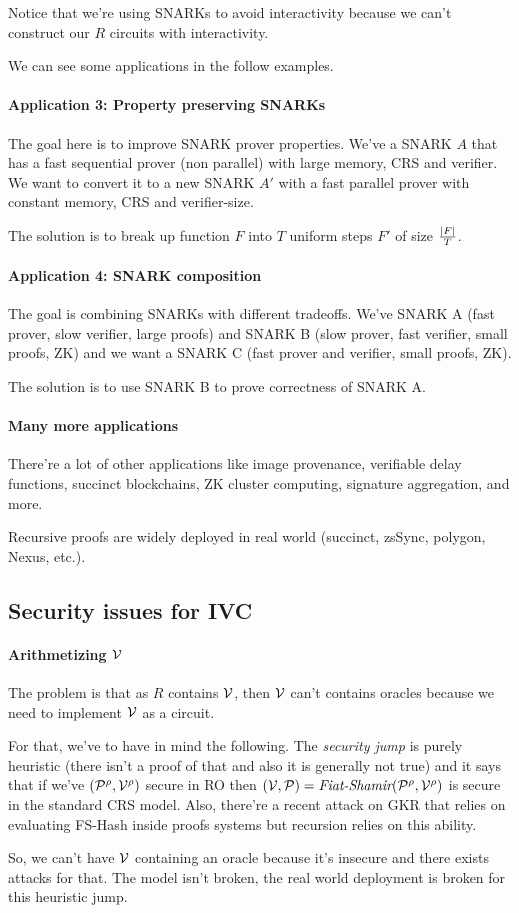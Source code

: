   Notice that we're using SNARKs to avoid interactivity because we can't construct 
  our $R$ circuits with interactivity.

  We can see some applications in the follow examples.

  \paragraph{Application 3: Property preserving SNARKs}
  The goal here is to improve SNARK prover properties.
  We've a SNARK $A$ that has a fast sequential prover (non parallel) with large memory, CRS and verifier.
  We want to convert it to a new SNARK $A'$ with a fast parallel prover with constant memory, CRS 
  and verifier-size.

  The solution is to break up function $F$ into $T$ uniform steps $F'$ of size $\frac{\left| F \right|}{T}$.

  \paragraph{Application 4: SNARK composition}
  The goal is combining SNARKs with different tradeoffs.
  We've SNARK A (fast prover, slow verifier, large proofs) and SNARK B 
  (slow prover, fast verifier, small proofs, ZK) and we want a SNARK C 
  (fast prover and verifier, small proofs, ZK).

  The solution is to use SNARK B to prove correctness of SNARK A.

  \paragraph{Many more applications}
  There're a lot of other applications like image provenance, verifiable delay 
  functions, succinct blockchains, ZK cluster computing, signature aggregation, and more.

  Recursive proofs are widely deployed in real world (succinct, zsSync, polygon,
  Nexus, etc.).

  \subsection{Security issues for IVC}
  \paragraph{Arithmetizing $\mathcal{V}$}
  The problem is that as $R$ contains $\mathcal{V}$, then $\mathcal{V}$ can't contains oracles because
  we need to implement $\mathcal{V}$ as a circuit.

  For that, we've to have in mind the following.
  The \textit{security jump} is purely heuristic (there isn't a proof of that and also 
  it is generally not true) and it says that if we've $(\mathcal{P}^\rho, \mathcal{V}^\rho)$ secure in RO
  then $(\mathcal{V},\mathcal{P}) = \textit{Fiat-Shamir}(\mathcal{P}^\rho,\mathcal{V}^\rho)$ is secure in the standard 
  CRS model.
  Also, there're a recent attack on GKR that relies on evaluating FS-Hash inside proofs systems
  but recursion relies on this ability.

  So, we can't have $\mathcal{V}$ containing an oracle because it's insecure and
  there exists attacks for that.
  The model isn't broken, the real world deployment is broken for this 
  heuristic jump.

